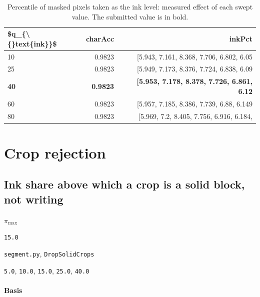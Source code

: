 \begin{table}[htbp]
\centering
\small
\caption{Percentile of masked pixels taken as the ink level: measured effect of each swept value. The submitted value is in bold.}
\begin{tabular}{lrr}
\toprule
\$q\_\{\textbackslash\{\}text\{ink\}\}\$ & \textsf{charAcc} & \textsf{inkPct} \\
\midrule
10 & 0.9823 & [5.943, 7.161, 8.368, 7.706, 6.802, 6.05 \\
25 & 0.9823 & [5.949, 7.173, 8.376, 7.724, 6.838, 6.09 \\
\bfseries 40 & \bfseries 0.9823 & \bfseries [5.953, 7.178, 8.378, 7.726, 6.861, 6.12 \\
60 & 0.9823 & [5.957, 7.185, 8.386, 7.739, 6.88, 6.149 \\
80 & 0.9823 & [5.969, 7.2, 8.405, 7.756, 6.916, 6.184, \\
\bottomrule
\end{tabular}
\end{table}

\section{Crop rejection}

\subsection{Ink share above which a crop is a solid block, not writing}

\label{coef:solid-abs-pct}

\begin{description}[leftmargin=5.2em,style=sameline]

\item[Symbol] $\pi_{\max}$

\item[Value] \texttt{15.0}

\item[Source] \texttt{segment.py}, \texttt{DropSolidCrops}

\item[Swept] \texttt{5.0}, \texttt{10.0}, \texttt{15.0}, \texttt{25.0}, \texttt{40.0}

\end{description}

\paragraph{Basis}

